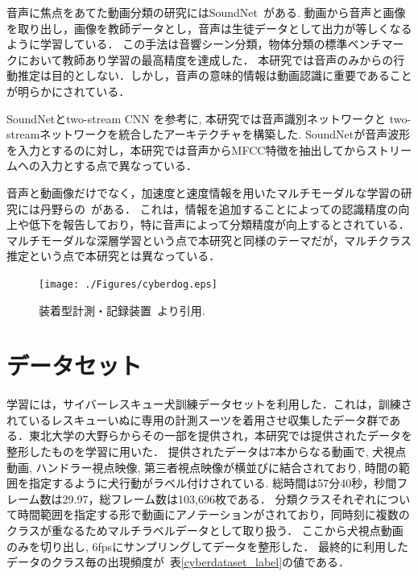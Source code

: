 \documentclass[MIRU,submit]{miru2019j}
\begin{document}
音声に焦点をあてた動画分類の研究にはSoundNet~\cite{aytar2016soundnet}がある.
動画から音声と画像を取り出し，画像を教師データとし，音声は生徒データとして出力が等しくなるように学習している．
この手法は音響シーン分類，物体分類の標準ベンチマークにおいて教師あり学習の最高精度を達成した．
本研究では音声のみからの行動推定は目的としない．しかし，音声の意味的情報は動画認識に重要であることが明らかにされている．

SoundNetとtwo-stream CNN を参考に, 本研究では音声識別ネットワークと two-streamネットワークを統合したアーキテクチャを構築した.
SoundNetが音声波形を入力とするのに対し，本研究では音声からMFCC特徴を抽出してからストリームへの入力とする点で異なっている．

音声と動画像だけでなく，加速度と速度情報を用いたマルチモーダルな学習の研究には丹野らの~\cite{tanno2019deim}がある．
これは，情報を追加することによっての認識精度の向上や低下を報告しており，特に音声によって分類精度が向上するとされている．
マルチモーダルな深層学習という点で本研究と同様のテーマだが，マルチクラス推定という点で本研究とは異なっている．

\begin{figure}[tb]
 \begin{center}
  \texttt{[image: ./Figures/cyberdog.eps]}
  \caption{装着型計測・記録装置~\cite{dog01}より引用.}
  \label{cyber}
 \end{center}
\end{figure}

\section{データセット}
学習には，サイバーレスキュー犬訓練データセットを利用した．これは，訓練されているレスキューいぬに専用の計測スーツを着用させ収集したデータ群である．東北大学の大野らからその一部を提供され，本研究では提供されたデータを整形したものを学習に用いた．
提供されたデータは7本からなる動画で, 犬視点動画, ハンドラー視点映像, 第三者視点映像が横並びに結合されており, 時間の範囲を指定するように犬行動がラベル付けされている.
総時間は57分40秒，秒間フレーム数は29.97，総フレーム数は103,696枚である．
分類クラスそれぞれについて時間範囲を指定する形で動画にアノテーションがされており，同時刻に複数のクラスが重なるためマルチラベルデータとして取り扱う．
ここから犬視点動画のみを切り出し, 6fpsにサンプリングしてデータを整形した．
最終的に利用したデータのクラス毎の出現頻度が~表\ref{cyberdataset_label}の値である．
\end{document}
